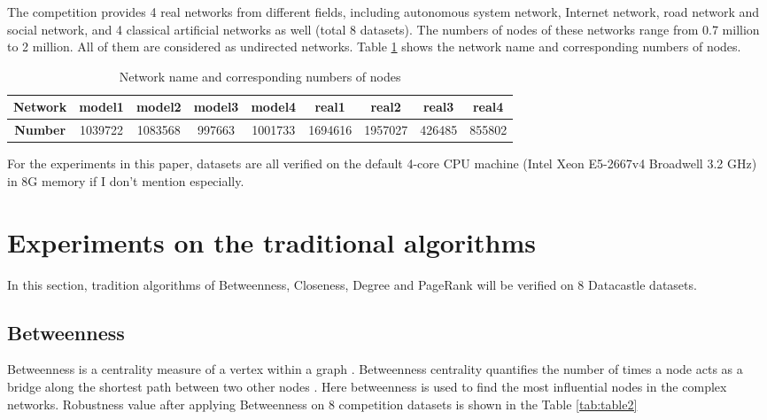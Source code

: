 \documentclass{article}
\begin{document}
	
	The competition provides 4 real networks from different fields, including autonomous system network, Internet network, road network and social network, and 4 classical artificial networks as well (total 8 datasets). The numbers of nodes of these networks range from 0.7 million to 2 million. All of them are considered as undirected networks. Table \ref{tab:table1} shows the network name and corresponding numbers of nodes.
	

	\begin{table}[!htbp]
	
	\centering
	\caption{ Network name and corresponding numbers of nodes}
	\label{tab:table1}
		\begin{tabular}{|c|c|c|c|c|c|c|c|c|}
			\hline
			\textbf{Network} & \textbf{model1} & \textbf{model2} & \textbf{model3} & \textbf{model4} & \textbf{real1} & \textbf{real2} & \textbf{real3} & \textbf{real4} \\ \hline
			\textbf{Number} & 1039722         & 1083568         & 997663          & 1001733         & 1694616        & 1957027        & 426485         & 855802         \\ \hline
		\end{tabular}
	\end{table}

	For the experiments in this paper, datasets are all verified on the default 4-core CPU machine (Intel Xeon E5-2667v4 Broadwell 3.2 GHz) in 8G memory if I don't mention especially.


	\section{Experiments on the traditional algorithms}
	
	In this section, tradition algorithms of Betweenness\cite{wikiBetweennesscentrality}, Closeness\cite{wikiClosenesscentrality}, Degree\cite{wikiCentrality} and PageRank\cite{wikiPageRank}  will be verified on 8 Datacastle datasets. 

	\subsection{Betweenness}
	
	Betweenness is a centrality measure of a vertex within a graph . Betweenness centrality quantifies the number of times a node acts as a bridge along the shortest path between two other nodes \cite{wikiBetweennesscentrality}\cite{freeman1977set}. Here betweenness is used to find the most influential nodes in the complex networks. Robustness value after applying Betweenness on 8 competition datasets is shown in the Table \ref{tab:table2}
	
\end{document}
